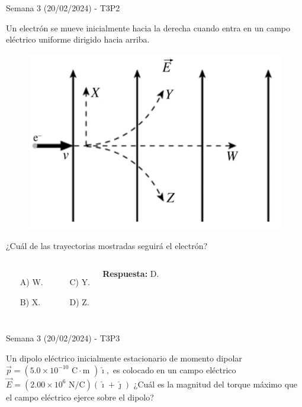 \begin{frame}{Semana 3 (20/02/2024) - T3P2}

    Un electrón se mueve inicialmente hacia la derecha cuando entra en un campo eléctrico uniforme dirigido hacia arriba.
    
    \begin{figure}
        \centering
        \includegraphics[scale=0.3]{figures/t3p2.png}
    \end{figure}
    
    ¿Cuál de las trayectorias mostradas seguirá el electrón?
    
    \begin{columns}
    
    \begin{itemize}
        \item[A)] W.
        \item[B)] X.
    \end{itemize}
    
    
    \begin{itemize}
        \item[C)] Y.
        \item[D)] Z.
    \end{itemize}
    
    \pause\centering\textbf{Respuesta:} D.
    \end{columns}
    
\end{frame}

\begin{frame}{Semana 3 (20/02/2024) - T3P3}

    Un dipolo eléctrico inicialmente estacionario de momento dipolar $\Vec{p}=\left(5.0\times10^{-10}\text{ C}\cdot\text{m }\right)\hat{\imath},$ es colocado en un campo eléctrico $\vec{E}=\left( 2.00\times10^6\text{ N/C} \right)\left(\hat{\imath}+\hat{\jmath}\right)$ ¿Cuál es la magnitud del torque máximo que el campo eléctrico ejerce sobre el dipolo?
    
\end{frame}

